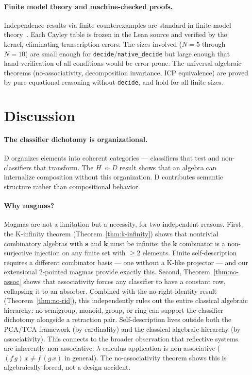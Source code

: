 \documentclass[sigconf,screen]{acmart}
\theoremstyle{remark}
\begin{document}
\paragraph{Finite model theory and machine-checked proofs.}
Independence results via finite counterexamples are standard in finite model theory~\cite{libkin04}. Each Cayley table is frozen in the Lean source and verified by the kernel, eliminating transcription errors. The sizes involved ($N\!=\!5$ through $N\!=\!10$) are small enough for \texttt{decide}/\texttt{native\_decide} but large enough that hand-verification of all conditions would be error-prone. The universal algebraic theorems (no-associativity, decomposition invariance, ICP equivalence) are proved by pure equational reasoning without \texttt{decide}, and hold for all finite sizes.

\section{Discussion}
\label{sec:discussion}

\paragraph{The classifier dichotomy is organizational.}
D organizes elements into coherent categories --- classifiers that test and non-classifiers that transform. The $H \not\Rightarrow D$ result shows that an algebra can internalize composition without this organization. D contributes semantic structure rather than compositional behavior.

\paragraph{Why magmas?}
Magmas are not a limitation but a necessity, for two independent reasons. First, the K-infinity theorem (Theorem~\ref{thm:k-infinity}) shows that nontrivial combinatory algebras with $\mathbf{s}$ and $\mathbf{k}$ must be infinite: the $\mathbf{k}$ combinator is a non-surjective injection on any finite set with $\geq 2$ elements. Finite self-description requires a different combinator basis --- one without a K-like projector --- and our extensional 2-pointed magmas provide exactly this. Second, Theorem~\ref{thm:no-assoc} shows that associativity forces any classifier to have a constant row, collapsing it to an absorber. Combined with the no-right-identity result (Theorem~\ref{thm:no-rid}), this independently rules out the entire classical algebraic hierarchy: no semigroup, monoid, group, or ring can support the classifier dichotomy alongside a retraction pair. Self-description lives outside both the PCA/TCA framework (by cardinality) and the classical algebraic hierarchy (by associativity). This connects to the broader observation that reflective systems are inherently non-associative: $\lambda$-calculus application is non-associative ($(f\,g)\,x \neq f\,(g\,x)$ in general). The no-associativity theorem shows this is algebraically forced, not a design accident.
\end{document}
